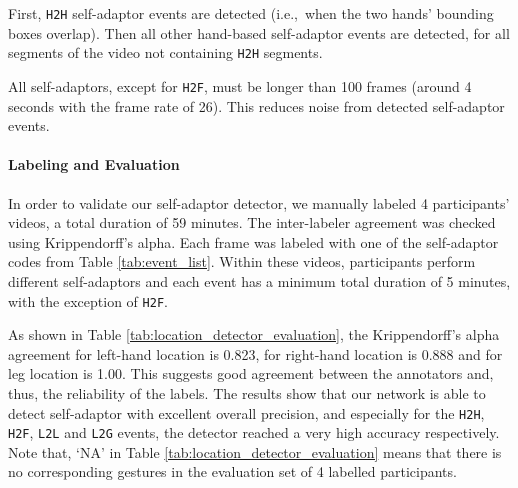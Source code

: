 First, \texttt{H2H} self-adaptor events are detected (i.e.,\ when the two hands' bounding boxes overlap). 
Then all other hand-based self-adaptor events are detected, for all segments of the video not containing \texttt{H2H} segments. 


All self-adaptors, except for \texttt{H2F}, must be longer than 100 frames (around 4 seconds with the frame rate of 26). 
This reduces noise from detected self-adaptor events.






\paragraph{Labeling and Evaluation}
In order to validate our self-adaptor detector, we manually labeled 4 participants' videos, a total duration of 59 minutes. 
The inter-labeler agreement was checked using Krippendorff's alpha.
Each frame was labeled with one of the self-adaptor codes from Table \ref{tab:event_list}. 
Within these videos, participants perform different self-adaptors and each event has a minimum total duration of 5 minutes, with the exception of \texttt{H2F}. 

As shown in Table \ref{tab:location_detector_evaluation}, the  Krippendorff’s alpha agreement for left-hand location is 0.823, for right-hand location is 0.888 and for leg location is 1.00. 
This suggests good agreement between the annotators and, thus, the reliability of the labels. 
The results show that our network is able to detect self-adaptor with excellent overall precision, and especially for the \texttt{H2H}, \texttt{H2F}, \texttt{L2L} and \texttt{L2G} events, the detector reached a very high accuracy respectively. 
Note that, `NA' in Table \ref{tab:location_detector_evaluation} means that there is no corresponding gestures in the evaluation set of 4 labelled participants.





